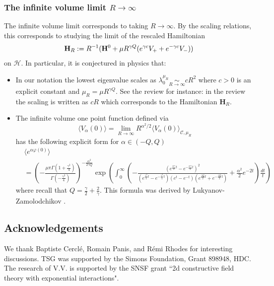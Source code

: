 \documentclass[11pt]{amsart}
\numberwithin{equation}{section}
\newcounter{conj}
\theoremstyle{definition}
\renewcommand{\H}{\mathbb{H}}
\def\H{\mathbf{H}}
\newcommand{\mc}{\mathcal}
\begin{document}
\subsubsection{The infinite volume limit $R \to \infty$}
The infinite volume limit corresponds to taking $R \to \infty$. By the scaling relations, this corresponds to studying the limit of the rescaled Hamiltonian 
\[ \H_{R}:=R^{-1}({\bf H}^0+\mu R^{\gamma Q}(e^{\gamma c}V_+ +e^{-\gamma c}V_-))\] 
on $\mc{H}$. In particular, it is conjectured in physics that:
\begin{itemize}
\item
In our notation the lowest eigenvalue scales as $\lambda_0^{\mu_R} \underset{R \to \infty}{\sim} c R^2$ where $c>0$ is an explicit constant and $\mu_R=\mu R^{\gamma Q}$. 
See the review \cite{Mussardo21} for instance: in the review the scaling is written as $c R$ which corresponds to the Hamiltonian $\H_R$.
\item
The infinite volume one point function defined via 
\begin{equation*}
\langle V_\alpha(0) \rangle = \underset{R \to \infty}{\lim} R^{\alpha^2/2} \langle V_\alpha (0) \rangle_{\mc{C},\mu_R}\end{equation*}
 has the following explicit form for $\alpha \in (-Q,Q)$
\begin{align*}
& \langle e^{\alpha \varphi(0) } \rangle   \\
&= \left (  -\frac{\mu \pi \Gamma (1+\frac{\gamma^2}{4})}{\Gamma (-\frac{\gamma^2}{4})}  \right )^{-\frac{\alpha^2}{2 \gamma Q}}   \exp \left (  \int_0^\infty\left ( - \frac{(e^{\frac{\alpha \gamma}{2}t }  -e^{-\frac{\alpha \gamma}{2}t }  )^2}{(e^{\frac{ \gamma^2}{4}t }  -e^{-\frac{ \gamma^2}{4}t })(e^t-e^{-t})( e^{\frac{\gamma Q}{2}t }+e^{-\frac{\gamma Q}{2}t } )}   + \frac{\alpha^2}{2}e^{-2 t}  \right )     \frac{dt}{t} \right )
\end{align*}
where recall that $Q=\frac{\gamma}{2}+\frac{2}{\gamma}$. This formula was derived by Lukyanov-Zamolodchikov \cite{LukZam}.  
\end{itemize}


\subsection*{Acknowledgements}

We thank Baptiste Cercl\'e, Romain Panis, and R\'emi Rhodes for interesting discussions. TSG was supported by the Simons Foundation, Grant 898948, HDC. The research of V.V. is supported by the SNSF grant ``2d constructive field theory  with exponential interactions".
\end{document}
